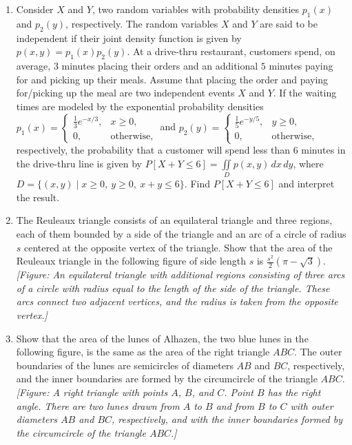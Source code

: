 \documentclass{exercises}
\begin{document}
\begin{enumerate}[resume]
\item Consider $X$ and $Y$, two random variables with probability densities $p_{1}(x)$ and $p_{2}(y)$, respectively. The random variables $X$ and $Y$ are said to be independent if their joint density function is given by $p(x,y)=p_{1}(x)p_{2}(y)$. At a drive-thru restaurant, customers spend, on average, $3$ minutes placing their orders and an additional $5$ minutes paying for and picking up their meals. Assume that placing the order and paying for/picking up the meal are two independent events $X$ and $Y$. If the waiting times are modeled by the exponential probability densities $p_{1}(x)=\begin{cases}\frac{1}{3}e^{-x/3}, & x\ge 0, \\ 0, & \text{otherwise},\end{cases}$ and $p_{2}(y)=\begin{cases}\frac{1}{5}e^{-y/5}, & y\ge 0, \\ 0, & \text{otherwise},\end{cases}$ respectively, the probability that a customer will spend less than $6$ minutes in the drive-thru line is given by $P[X+Y\le 6]=\underset{D}{\iint}p(x,y)\,dx\,dy$, where $D=\{(x,y)\mid x\ge 0,\ y\ge 0,\ x+y\le 6\}$. Find $P[X+Y\le 6]$ and interpret the result.
\item \techrequired The Reuleaux triangle consists of an equilateral triangle and three regions, each of them bounded by a side of the triangle and an arc of a circle of radius $s$ centered at the opposite vertex of the triangle. Show that the area of the Reuleaux triangle in the following figure of side length $s$ is $\frac{s^{2}}{2}(\pi-\sqrt{3})$. \\ \textit{[Figure: An equilateral triangle with additional regions consisting of three arcs of a circle with radius equal to the length of the side of the triangle. These arcs connect two adjacent vertices, and the radius is taken from the opposite vertex.]}
\item \techrequired Show that the area of the lunes of Alhazen, the two blue lunes in the following figure, is the same as the area of the right triangle $ABC$. The outer boundaries of the lunes are semicircles of diameters $AB$ and $BC$, respectively, and the inner boundaries are formed by the circumcircle of the triangle $ABC$. \\ \textit{[Figure: A right triangle with points $A$, $B$, and $C$. Point $B$ has the right angle. There are two lunes drawn from $A$ to $B$ and from $B$ to $C$ with outer diameters $AB$ and $BC$, respectively, and with the inner boundaries formed by the circumcircle of the triangle $ABC$.]}
\end{enumerate}
\end{document}
